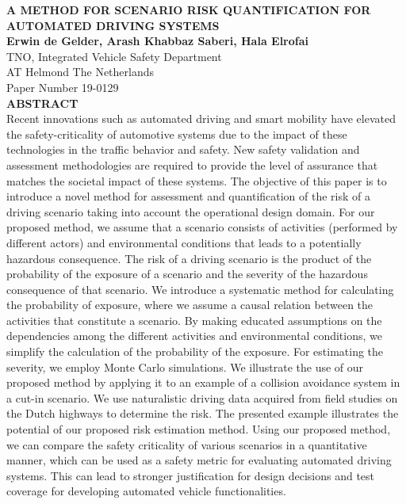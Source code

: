 \documentclass[10pt,final,letterpaper,oneside,onecolumn]{article}
\begin{document}
\noindent \MakeTextUppercase{\textbf{\large{A Method for Scenario Risk Quantification for Automated Driving Systems}}}\\

\noindent \textbf{Erwin de Gelder, Arash Khabbaz Saberi, Hala Elrofai}\\
\noindent TNO, Integrated Vehicle Safety Department\\
 AT Helmond The Netherlands\\

\noindent Paper Number 19-0129\\

\noindent \textbf{\large{ABSTRACT}}\\

\noindent Recent innovations such as automated driving and smart mobility have elevated the safety-criticality of automotive systems due to the impact of these technologies in the traffic behavior and safety. New safety validation and assessment methodologies are required to provide the level of assurance that matches the societal impact of these systems.
The objective of this paper is to introduce a novel method for assessment and quantification of the risk of a driving scenario taking into account the operational design domain. 
For our proposed method, we assume that a scenario consists of activities (performed by different actors) and environmental conditions that leads to a potentially hazardous consequence.
The risk of a driving scenario is the product of the probability of the exposure of a scenario and the severity of the hazardous consequence of that scenario.
We introduce a systematic method for calculating the probability of exposure, 
where we assume a causal relation between the activities that constitute a scenario. 
By making educated assumptions on the dependencies among the different activities and environmental conditions, 
we simplify the calculation of the probability of the exposure. 
For estimating the severity, we employ Monte Carlo simulations.
We illustrate the use of our proposed method by applying it to an example of a collision avoidance system in a cut-in scenario.	
We use naturalistic driving data acquired from field studies on the Dutch highways to determine the risk. 
The presented example illustrates the potential of our proposed risk estimation method. 
Using our proposed method, we can compare the safety criticality of various scenarios in a quantitative manner, which can be used as a safety metric for evaluating automated driving systems. 
This can lead to stronger justification for design decisions and test coverage for developing automated vehicle functionalities.


\pagebreak







\printbibliography[title=\hspace{7.5pt} References]
\end{document}
